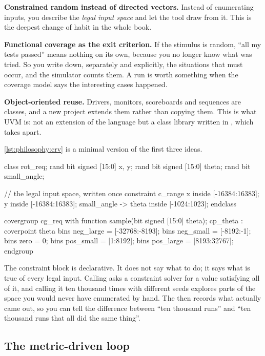 \textbf{Constrained random instead of directed vectors.} Instead of enumerating
inputs, you describe the \emph{legal input space} and let the tool draw from
it. This is the deepest change of habit in the whole book.

\textbf{Functional coverage as the exit criterion.} If the stimulus is random,
``all my tests passed'' means nothing on its own, because you no longer know
what was tried. So you write down, separately and explicitly, the situations
that must occur, and the simulator counts them. A run is worth something when
the coverage model says the interesting cases happened.

\textbf{Object-oriented reuse.} Drivers, monitors, scoreboards and sequences
are classes, and a new project extends them rather than copying them. This is
what UVM is: not an extension of the language but a class library written in
\SV{}, which  takes apart.

\cref{lst:philosophy:crv} is a minimal version of the first three ideas.

\begin{svcode}[caption={Constraints describe the legal space; coverage measures what happened},label={lst:philosophy:crv}]
class rot_req;
  rand bit signed [15:0] x, y;
  rand bit signed [15:0] theta;
  rand bit               small_angle;

  // the legal input space, written once
  constraint c_range {
    x inside {[-16384:16383]};
    y inside {[-16384:16383]};
    small_angle -> theta inside {[-1024:1023]};
  }
endclass

covergroup cg_req with function sample(bit signed [15:0] theta);
  cp_theta : coverpoint theta {
    bins neg_large = {[-32768:-8193]};
    bins neg_small = {[-8192:-1]};
    bins zero      = {0};
    bins pos_small = {[1:8192]};
    bins pos_large = {[8193:32767]};
  }
endgroup
\end{svcode}

The constraint block is declarative. It does not say what to do; it says what
is true of every legal input. Calling  asks a constraint
solver for a value satisfying all of it, and calling it ten thousand times with
different seeds explores parts of the space you would never have enumerated by
hand. The  then records what actually came out, so you can
tell the difference between ``ten thousand runs'' and ``ten thousand runs that
all did the same thing''.

\subsection{The metric-driven loop}

